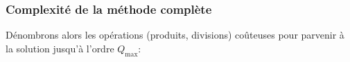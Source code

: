 \documentclass[svgnames,dvipsnames,a4paper,10pt,french]{report}
\begin{document}


\subsubsection{Complexité de la méthode complète}

Dénombrons alors les opérations (produits, divisions) coûteuses pour parvenir à la solution jusqu'à l'ordre $Q_\text{max}$:
\end{document}

